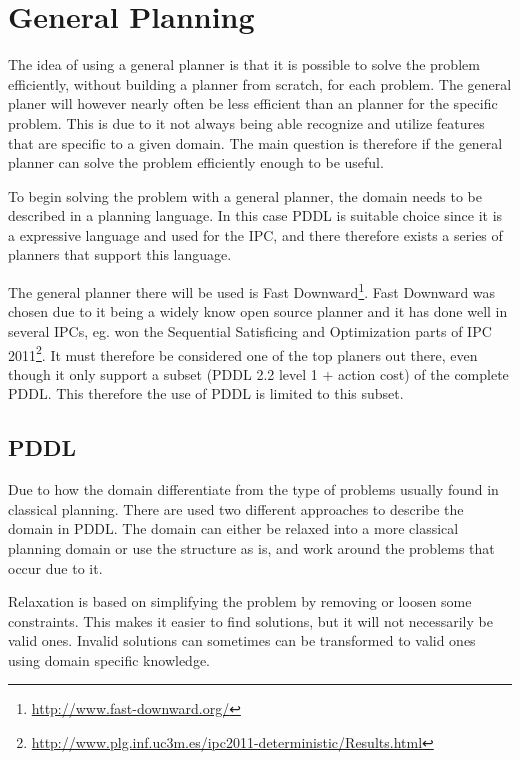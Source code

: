 \chapter{General Planning}
	The idea of using a general planner is that it is possible to solve the problem efficiently, without building a planner from scratch, for each problem. The general planer will however nearly often be less efficient than an planner for the specific problem. This is due to it not always being able recognize and utilize features that are specific to a given domain. The main question is therefore if the general planner can solve the problem efficiently enough to be useful.

	To begin solving the problem with a general planner, the domain needs to be described in a planning language. In this case PDDL is suitable choice since it is a expressive language and used for the IPC, and there therefore exists a series of planners that support this language.
 
	  
	The general planner there will be used is Fast Downward\footnote{\url{http://www.fast-downward.org/}}. Fast Downward was chosen due to it being a widely know open source planner and it has done well in several IPCs, eg. won the Sequential Satisficing and Optimization parts of IPC 2011\footnote{\url{http://www.plg.inf.uc3m.es/ipc2011-deterministic/Results.html}}. It must therefore be considered one of the top planers out there, even though it only support a subset (PDDL 2.2 level 1 + action cost) of the complete PDDL. This therefore the use of PDDL is limited to this subset. 
 
 \section{PDDL}
	Due to how the domain differentiate from the type of problems usually found in classical planning. There are used two different approaches to describe the domain in PDDL. The domain can either be relaxed into a more classical planning domain or use the structure as is, and work around the problems that occur due to it.
	
	Relaxation is based on simplifying the problem by removing or loosen some constraints. This makes it easier to find solutions, but it will not necessarily be valid ones. Invalid solutions can sometimes can be transformed to valid ones using domain specific knowledge.
	
